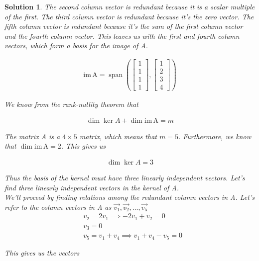 \documentclass{article}
\newtheorem*{solution}{Solution}
\newcommand{\im}[1]{\mathrm{im \, #1}}
\DeclareMathOperator{\Span}{span}
\begin{document}
\begin{solution}
The second column vector is redundant because it is a scalar multiple of the first. The third column vector is redundant because it's the zero vector. The fifth column vector is redundant because it's the sum of the first column vector and the fourth column vector. This leaves us with the first and fourth column vectors, which form a basis for the image of A.

\begin{align*}
\im{A} = \Span \left( \begin{bmatrix}1 \\ 1 \\ 1 \\ 1 \end{bmatrix}, \begin{bmatrix}1 \\ 2 \\ 3 \\ 4 \end{bmatrix} \right)
\end{align*} 

We know from the rank-nullity theorem that 

\begin{align*}
\dim \ker A + \dim \im A = m
\end{align*}

The matrix A is a $4 \times 5$ matrix, which means that $m = 5$. Furthermore, we know that $\dim \im A = 2$. This gives us

\begin{align*}
\dim \ker A = 3 
\end{align*}

Thus the basis of the kernel must have three linearly independent vectors. Let's find three linearly independent vectors in the kernel of A. \\

We'll proceed by finding relations among the redundant column vectors in A. Let's refer to the column vectors in A as $\vec{v_{1}}, \vec{v_{2}}, \ldots, \vec{v_{5}}$ \\

\begin{align*}
& v_{2} = 2v_{1} \implies -2v_{1} + v_{2}  = 0 \\
& v_{3} = 0 \\
& v_{5} = v_{1} + v_{4} \implies v_{1} + v_{4} - v_{5} = 0
\end{align*}

This gives us the vectors


\end{solution}
\end{document}
